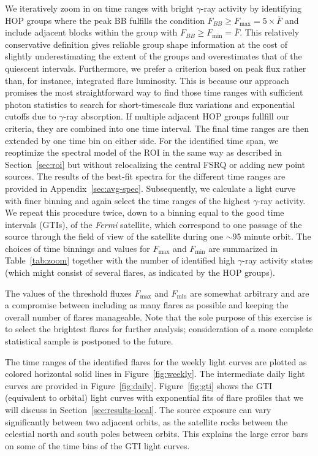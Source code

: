 \documentclass[twocolumn]{aastex62}
\newcommand{\gray}{$\gamma$-ray\xspace}
\newcommand{\Fermi}{\emph{Fermi}\xspace}
\begin{document}
We iteratively zoom in on time ranges with bright \gray activity by identifying HOP groups where the peak BB fulfills the condition $F_{BB} \geqslant F_\mathrm{max} =  5\times\overline{F}$ and include adjacent blocks within the group with $F_{BB} \geqslant F_\mathrm{min} = \overline{F}$. 
This relatively conservative definition 
gives reliable group shape information 
at the cost of 
slightly underestimating the extent of the
groups and overestimates that of the quiescent 
intervals.
Furthermore, we prefer a criterion based on peak flux rather than, for instance, integrated flare luminosity.
This is because our approach promises the most straightforward way to find those time ranges with sufficient photon statistics to search for short-timescale flux variations and exponential cutoffs due to \gray absorption.
If multiple  adjacent HOP groups fullfill our criteria, they are combined into one time interval. 
The final time ranges are then extended by one time bin on either side.
For the identified time span, we reoptimize the spectral model of the ROI in the same way as described in Section~\ref{sec:roi} but without relocalizing the central FSRQ or adding new point sources. 
The results of the best-fit spectra for the different time ranges are provided in Appendix~\ref{sec:avg-spec}.
Subsequently, we calculate a light curve with finer binning and again select the time ranges of the highest \gray activity. We repeat this procedure twice, down to a binning equal to the good time intervals (GTIs), of the \Fermi satellite, which correspond to one passage of the source through the field of view of the satellite during one $\sim$95 minute orbit.
The choices of time binnings and values for $F_\mathrm{max}$ and $F_\mathrm{min}$ are summarized in Table~\ref{tab:zoom} together with the number of identified high \gray activity states (which might consist of several flares, as indicated by the HOP groups).

The values of the threshold fluxes $F_\mathrm{max}$ and $F_\mathrm{min}$ are somewhat arbitrary and are a compromise between including as many flares as possible and keeping the overall number of flares manageable. Note that the sole purpose of this exercise is to select the brightest flares for further analysis; consideration of a more
complete statistical sample is postponed to 
the future.

The
time ranges of the identified flares
for the weekly light curves are plotted as colored horizontal solid lines in Figure~\ref{fig:weekly}.
The intermediate daily light curves are provided in Figure~\ref{fig:daily}.
Figure~\ref{fig:gti} shows the GTI (equivalent to orbital) light curves with exponential fits of flare profiles that we will discuss in Section~\ref{sec:results-local}. 
The source exposure can vary significantly between two adjacent orbits, as the satellite rocks between the celestial north and south poles between orbits. 
This explains the large error bars on some of the time bins of the GTI light curves.
\end{document}
